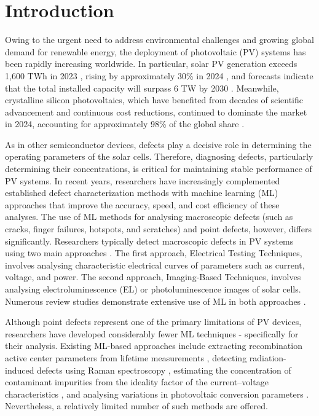 \documentclass[10pt]{iopart}
\begin{document}
\ioptwocol
%


\section{Introduction}\label{sec:Int}

Owing to the urgent need to address environmental challenges and growing global demand for renewable energy, the deployment of photovoltaic (PV) systems has been rapidly increasing worldwide.
In particular, solar PV generation exceeds 1,600 TWh in 2023 \cite{IEA2024Renewables, OSAMA2025}, rising by approximately 30\% in 2024 \cite{Prometheus2025}, and forecasts indicate that the 
total installed capacity will surpass 6 TW by 2030 \cite{IEA2024Renewables}.
Meanwhile, crystalline silicon photovoltaics, which have benefited from decades of scientific advancement and continuous cost reductions, continued to dominate the market in 2024, accounting for approximately 98\% of the global share \cite{Fischer2025ITRPV, THOME2025}.

As in other semiconductor devices, defects play a decisive role in determining the operating parameters of the solar cells.
Therefore, diagnosing defects, particularly determining their concentrations, is critical for maintaining stable performance of PV systems.
In recent years, researchers have increasingly complemented established defect characterization methods with machine learning (ML) approaches that improve the accuracy, speed, 
and cost efficiency of these analyses.
The use of ML methods for analysing macroscopic defects (such as cracks, finger failures, hotspots, and scratches) and point defects, however, differs significantly.
Researchers typically detect macroscopic defects in PV systems using two main approaches \cite{Jia2024, Hijjawi2023}.
The first approach, Electrical Testing Techniques, involves analysing characteristic electrical curves of parameters such as current, voltage, and power.
The second approach, Imaging-Based Techniques, involves analysing electroluminescence (EL) \cite{Liu2024a} or photoluminescence \cite{Doll2021} images of solar cells.
Numerous review studies demonstrate extensive use of ML in both approaches \cite{Datta2023, Jaiswal2023, Buratti2024, MAHDAVIPOUR, Hopwood2020, Li2021, Liu2021}.

Although point defects represent one of the primary limitations of PV devices, researchers have developed considerably fewer ML techniques - specifically for their analysis.
Existing ML-based approaches include extracting recombination active center parameters from lifetime measurements \cite{Wang2024a, Buratti2022, Buratti2020a},
detecting radiation-induced defects using Raman spectroscopy \cite{Park2022, Chia2024},
estimating the concentration of contaminant impurities from the ideality factor of the current–voltage characteristics \cite{Olikh2022PPV},
and analysing variations in photovoltaic conversion parameters \cite{Olikh2025SE}.
Nevertheless, a relatively limited number of such methods are offered.
\end{document}
